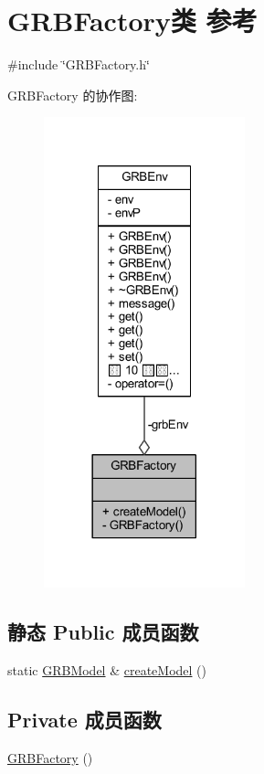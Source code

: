 \hypertarget{classGRBFactory}{}\section{G\+R\+B\+Factory类 参考}
\label{classGRBFactory}


{\ttfamily \#include \char`\"{}G\+R\+B\+Factory.\+h\char`\"{}}



G\+R\+B\+Factory 的协作图\+:
\nopagebreak
\begin{figure}[H]
\begin{center}
\leavevmode
\includegraphics[width=165pt]{classGRBFactory__coll__graph}
\end{center}
\end{figure}
\subsection*{静态 Public 成员函数}
\begin{DoxyCompactItemize}
\item 
static \hyperlink{classGRBModel}{G\+R\+B\+Model} \& \hyperlink{classGRBFactory_aadd50eacec778be1265b494b4348fe8c}{create\+Model} ()
\end{DoxyCompactItemize}
\subsection*{Private 成员函数}
\begin{DoxyCompactItemize}
\item 
\hyperlink{classGRBFactory_a08b7599eb8c438a5576db24c82e6641d}{G\+R\+B\+Factory} ()
\end{DoxyCompactItemize}
